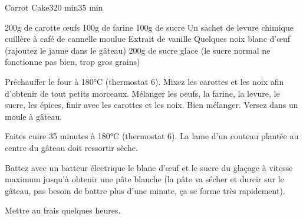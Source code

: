 \begin{recette}{Carrot Cake}{3}{20 min}{35 min}
\begin{ingredients}
\ingredient 200g de carotte
 œufs
\ingredient 100g de farine
\ingredient 100g de sucre
\ingredient Un sachet de levure chimique
 cuillère à café de cannelle moulue
\ingredient Extrait de vanille
\ingredient Quelques noix
 blanc d'œuf (rajoutez le jaune dans le gâteau)
\ingredient 200g de sucre glace (le sucre normal ne fonctionne pas bien, trop gros grains)
\end{ingredients}

\begin{preparation}
\etape Préchauffer le four à 180°C (thermostat 6).
\etape Mixez les carottes et les noix afin d'obtenir de tout petits morceaux.
\etape Mélanger les oeufs, la farine, la levure, le sucre, les épices, finir avec les carottes et les noix.
\etape Bien mélanger.
\etape Versez dans un moule à gâteau.
\end{preparation}

\begin{cuisson}
Faites cuire 35 minutes à 180°C (thermostat 6). La lame d'un couteau plantée au centre du gâteau doit ressortir sèche.

Battez avec un batteur électrique le blanc d'œuf et le sucre du glaçage à vitesse maximum jusqu'à obtenir une pâte blanche (la 
pâte va 
sécher et durcir sur le gâteau, pas besoin de battre plus d'une minute, ça se forme très rapidement).

Mettre au frais quelques heures.
\end{cuisson}
\end{recette}

